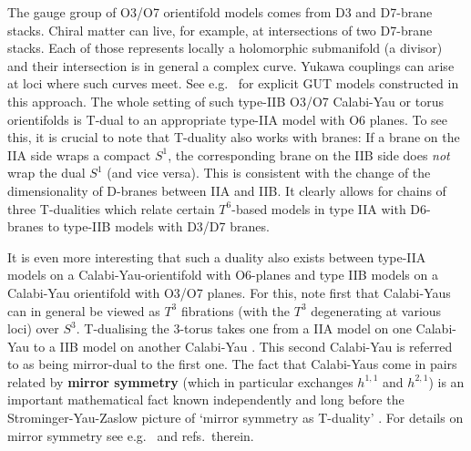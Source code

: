 \documentclass[12pt]{article}
\numberwithin{equation}{section}
\begin{document}
The gauge group of O3/O7 orientifold models comes from D3 and D7-brane stacks. Chiral matter can live, for example, at intersections of two D7-brane stacks. Each of those represents locally a holomorphic submanifold (a divisor) and their intersection is in general a complex curve. Yukawa couplings can arise at loci where such curves meet. See e.g.~\cite{Blumenhagen:2008zz} for explicit GUT models constructed in this approach. The whole setting of such type-IIB O3/O7 Calabi-Yau or torus orientifolds is T-dual to an appropriate type-IIA model with O6 planes. To see this, it is crucial to note that T-duality also works with branes: If a brane on the IIA side wraps a compact $S^1$, the corresponding brane on the IIB side does {\it not} wrap the dual $S^1$ (and vice versa). This is consistent with the change of the dimensionality of D-branes between IIA and IIB. It clearly allows for chains of three T-dualities which relate certain $T^6$-based models in type IIA with D6-branes to type-IIB models with D3/D7 branes. 

It is even more interesting that such a duality also exists between type-IIA models on a Calabi-Yau-orientifold with O6-planes and type IIB models on a Calabi-Yau orientifold with O3/O7 planes. For this, note first that Calabi-Yaus can in general be viewed as $T^3$ fibrations (with the $T^3$ degenerating at various loci) over $S^3$. T-dualising the 3-torus takes one from a IIA model on one Calabi-Yau to a IIB model on another Calabi-Yau \cite{Strominger:1996it}. This second Calabi-Yau is referred to as being mirror-dual to the first one. The fact that Calabi-Yaus come in pairs related by {\bf mirror symmetry} (which in particular exchanges $h^{1,1}$ and $h^{2,1}$) is an important mathematical fact known independently and long before the Strominger-Yau-Zaslow picture of `mirror symmetry as T-duality' \cite{Strominger:1996it}. For details on mirror symmetry see e.g.~\cite{Candelas:1993dm, Hosono:1994av, Hori:2002fa, Hori:2003ic} and refs.~therein.
\end{document}
